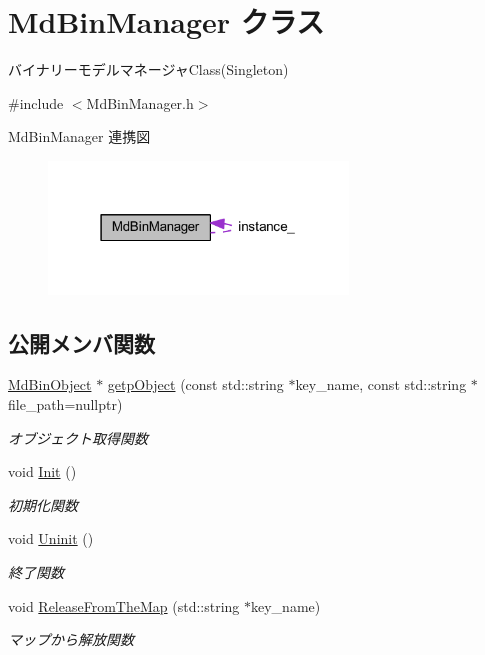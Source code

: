 \hypertarget{class_md_bin_manager}{}\section{Md\+Bin\+Manager クラス}
\label{class_md_bin_manager}


バイナリーモデルマネージャ\+Class(\+Singleton)  




{\ttfamily \#include $<$Md\+Bin\+Manager.\+h$>$}



Md\+Bin\+Manager 連携図\nopagebreak
\begin{figure}[H]
\begin{center}
\leavevmode
\includegraphics[width=226pt]{class_md_bin_manager__coll__graph}
\end{center}
\end{figure}
\subsection*{公開メンバ関数}
\begin{DoxyCompactItemize}
\item 
\mbox{\hyperlink{class_md_bin_object}{Md\+Bin\+Object}} $\ast$ \mbox{\hyperlink{class_md_bin_manager_abfdfbf033bef1ff3fe51a0b610e51bc6}{getp\+Object}} (const std\+::string $\ast$key\+\_\+name, const std\+::string $\ast$file\+\_\+path=nullptr)
\begin{DoxyCompactList}\small\item\em オブジェクト取得関数 \end{DoxyCompactList}\item 
void \mbox{\hyperlink{class_md_bin_manager_a650a250f797759d90708241b5718fe49}{Init}} ()
\begin{DoxyCompactList}\small\item\em 初期化関数 \end{DoxyCompactList}\item 
void \mbox{\hyperlink{class_md_bin_manager_a50f380e661e5a00e14f7d72ed6ffe6e3}{Uninit}} ()
\begin{DoxyCompactList}\small\item\em 終了関数 \end{DoxyCompactList}\item 
void \mbox{\hyperlink{class_md_bin_manager_a25cec221e76357ed3f0243a614fd1b0e}{Release\+From\+The\+Map}} (std\+::string $\ast$key\+\_\+name)
\begin{DoxyCompactList}\small\item\em マップから解放関数 \end{DoxyCompactList}\end{DoxyCompactItemize}
